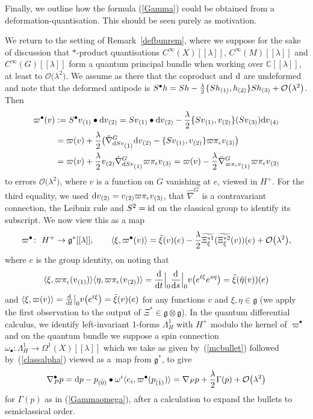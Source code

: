 \documentclass[pdftex]{sigma}
\numberwithin{equation}{section}
\newcommand{\C}{{\mathbb{C}}}
\newcommand{\<}{{\langle}}
\renewcommand{\>}{{\rangle}}
\newcommand{\tens}{\otimes}
\newcommand{\id}{{\rm id}}
\renewcommand{\o}{{}_{\scriptstyle(1)}}
\renewcommand{\t}{{}_{\scriptstyle(2)}}
\renewcommand{\th}{{}_{\scriptstyle(3)}}
\newcommand{\fo}{{}_{\scriptstyle(4)}}
\newcommand{\extd}{{\rm d}}
\newcommand{\eps}{\epsilon}
\newcommand{\co}{{}_{\scriptstyle \bar{(1)}}}
\newcommand{\rz}{{}_{\scriptstyle \bar{(0)}}}
\newcommand{\cg}{{\mathfrak{g}}}
\begin{document}
Finally, we outline how the formula (\ref{Gamma}) could be obtained from a deformation-quantisation. This should be seen purely as motivation.

\begin{Remark}\label{wedgeHequalsg} We return to the setting of Remark~\ref{defbunrem}, where we suppose for the sake of discussion that $*$-product quantisations $C^\infty(X)[[\lambda]]$, $C^\infty(M)[[\lambda]]$ and $C^\infty(G)[[\lambda]]$ form a quantum principal bundle when working over $\C[[\lambda]]$, at least to $\mathcal{O}\big(\lambda^2\big)$. We assume as there that the coproduct and $\extd$ are undeformed and note that the deformed antipode is $S^\bullet h=S h -{\lambda\over 2}\{S h\o,h\t\}S h\th+\mathcal{O}\big(\lambda^2\big)$. Then
\begin{align*} \varpi^\bullet (v)&:=S^\bullet v\o\bullet \extd v\t= S v\o\bullet \extd v\t- {\lambda\over 2}\{Sv\o,v\t\}(Sv\th)\extd v\fo\\
&=\varpi(v)+{\lambda\over 2}\big(\hat\nabla^G_{\extd Sv\o}\extd v\t-\{Sv\o,v\t\}\varpi\pi_\eps v\th\big)\\
&=\varpi(v)+ {\lambda\over 2}v\t \hat\nabla^G_{\extd Sv\o}\varpi\pi_\eps v\th=\varpi(v)-{\lambda\over 2}\hat\nabla^G_{\varpi\pi_\eps v\o}\varpi\pi_\eps v\t\end{align*}
to errors $\mathcal{O}\big(\lambda^2\big)$, where $v$ is a function on $G$ vanishing at $e$, viewed in $H^+$. For the third equality, we used $\extd v\t= v\t \varpi\pi_\eps v\th$, that $\hat\nabla^G$ is a contravariant connection, the Leibniz rule and $S^2=\id$ on the classical group to identify its subscript. We now view this as a map
\begin{equation}\label{mcbullet} \varpi^\bullet \colon \ H^+\to \cg^*[[\lambda]],\qquad \<\xi,\varpi^\bullet (v)\>=\tilde\xi(v)(e) - {\lambda\over 2}\widetilde{\Xi_\xi^{*1}}(\widetilde{\Xi_\xi^{*2}}(v))(e)+\mathcal{O}\big(\lambda^2\big),\end{equation}
 where $e$ is the group identity, on noting that
 \begin{equation*}\label{Xi2} \<\xi,\varpi\pi_\eps(v\o)\>\<\eta,\varpi\pi_\eps(v\t)\>={\extd\over\extd t}\Big|_0{\extd \over\extd s}\Big|_0v\big(e^{t\xi}e^{s\eta}\big)=\tilde\xi(\tilde\eta(v))(e)\end{equation*}
and $\<\xi,\varpi(v)\>={\extd \over\extd t}\big|_0v\big(e^{t\xi}\big)=\tilde\xi(v)(e)$ for any functions $v$ and $\xi,\eta\in\cg$ (we apply the first observation to the output of $\Xi^*\in \cg\tens\cg$). In the quantum differential calculus, we identify left-invariant 1-forms $\Lambda^1_H$ with $H^+$ modulo the kernel of $\varpi^\bullet $ and on the quantum bundle we suppose a spin connection $\omega_\bullet\colon \Lambda^1_H\to \Omega^1(X)[[\lambda]]$ which we take as given by~(\ref{mcbullet}) followed by~(\ref{classalpha}) viewed as a~map from $\cg^*$, to give
\[ \nabla^\bullet_P p=\extd p - p\rz \bullet \omega^i\<e_i,\varpi^\bullet (p\co)\>=\nabla_P p +{\lambda\over 2}\Gamma(p)+\mathcal{O}\big(\lambda^2\big)\]
for $\Gamma(p)$ as in (\ref{Gammaomega}), after a calculation to expand the bullets to semiclassical order. \end{Remark}
\end{document}
